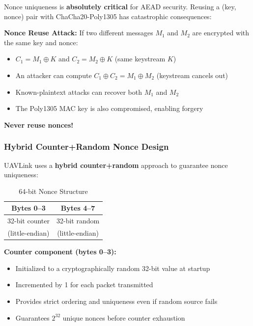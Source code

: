 \documentclass[11pt,a4paper]{article}
\begin{document}
Nonce uniqueness is \textbf{absolutely critical} for AEAD security. Reusing a (key, nonce) pair with ChaCha20-Poly1305 has catastrophic consequences:

\begin{alertbox}
\textbf{Nonce Reuse Attack:} If two different messages $M_1$ and $M_2$ are encrypted with the same key and nonce:
\begin{itemize}[noitemsep]
    \item $C_1 = M_1 \oplus K$ and $C_2 = M_2 \oplus K$ (same keystream $K$)
    \item An attacker can compute $C_1 \oplus C_2 = M_1 \oplus M_2$ (keystream cancels out)
    \item Known-plaintext attacks can recover both $M_1$ and $M_2$
    \item The Poly1305 MAC key is also compromised, enabling forgery
\end{itemize}
\textbf{Never reuse nonces!}
\end{alertbox}

\subsubsection{Hybrid Counter+Random Nonce Design}

UAVLink uses a \textbf{hybrid counter+random} approach to guarantee nonce uniqueness:

\begin{table}[H]
\centering
\begin{tabular}{|c|c|}
\hline
\textbf{Bytes 0--3} & \textbf{Bytes 4--7} \\
\hline
32-bit counter & 32-bit random \\
(little-endian) & (little-endian) \\
\hline
\end{tabular}
\caption{64-bit Nonce Structure}
\end{table}

\textbf{Counter component (bytes 0--3):}
\begin{itemize}[noitemsep]
    \item Initialized to a cryptographically random 32-bit value at startup
    \item Incremented by 1 for each packet transmitted
    \item Provides strict ordering and uniqueness even if random source fails
    \item Guarantees $2^{32}$ unique nonces before counter exhaustion
\end{itemize}
\end{document}
